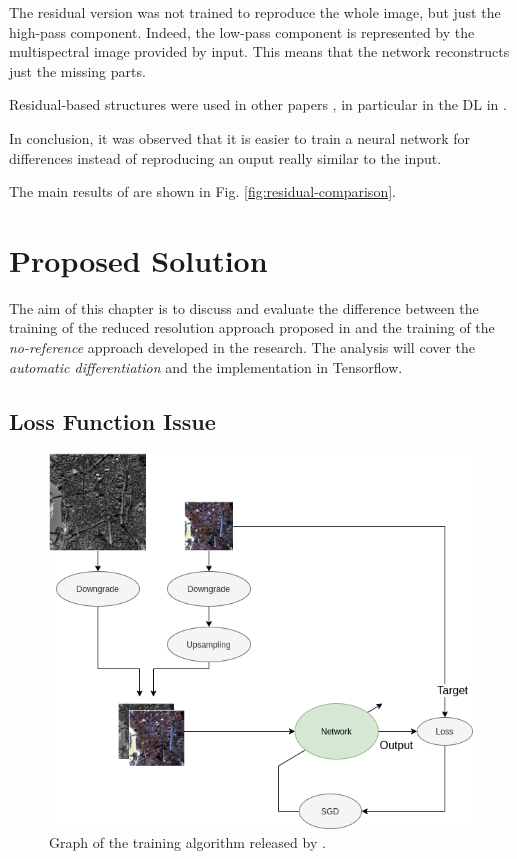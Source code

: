 \documentclass[12pt]{report}
\begin{document}
The residual version was not trained to reproduce the whole image,
but just the high-pass component. Indeed, the low-pass component is represented by the 
multispectral image provided by input. This means that the network reconstructs just the missing parts.

Residual-based structures were used in other papers \cite{residual1, residual2}, in particular in the DL in \cite{residual3, residual4}.

In conclusion, it was observed that it is easier to train a neural network for differences
instead of reproducing an ouput really similar to the input. 


The main results of \cite{residual4} are shown in Fig. \ref{fig:residual-comparison}.

\newpage

\chapter{Proposed Solution}


The aim of this chapter is to discuss and evaluate the difference between the training of the reduced resolution approach proposed in \cite{pnn}
and the training of the \textit{no-reference} approach developed in the research.
The analysis will cover the \textit{automatic differentiation} and the implementation in Tensorflow.

\section{Loss Function Issue}
\label{sec:lossfunction}
\begin{figure}[t]
    \centering
    \includegraphics[scale=.45]{RRTraining.png}
    \caption{Graph of the training algorithm released by \cite{pnn}.}
    \label{fig:rrtraining}
\end{figure}
\end{document}
